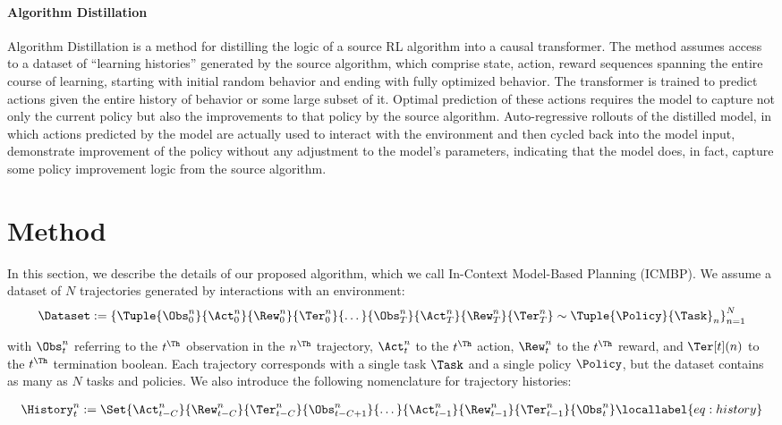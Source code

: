 \paragraph{Algorithm Distillation}
Algorithm Distillation \parencite{laskin2022context} is a method for distilling the
logic of a source RL algorithm into a causal transformer. The method assumes
access to a dataset of ``learning histories'' generated by the source algorithm,
which comprise state, action, reward sequences spanning the entire course of
learning, starting with initial random behavior and ending with fully optimized
behavior. The transformer is trained to predict actions given the entire history
of behavior or some large subset of it. Optimal prediction of these actions
requires the model to capture not only the current policy but also the
improvements to that policy by the source algorithm. Auto-regressive rollouts of
the distilled model, in which actions predicted by the model are actually used
to interact with the environment and then cycled back into the model input,
demonstrate improvement of the policy without any adjustment to the model's
parameters, indicating that the model does, in fact, capture some policy
improvement logic from the source algorithm.

\section{Method}
In this section, we describe the details of our proposed algorithm, which we
call In-Context Model-Based Planning (ICMBP). We assume a dataset of $N$
trajectories generated by interactions with an environment:
\begin{align}
    \Dataset :=
    \left\{
    \Tuple
    { \Obs^n_0 }
    { \Act^n_0 }
    { \Rew^n_0 }
    { \Ter^n_0 }
    { \dots }
    { \Obs^n_T }
    { \Act^n_T }
    { \Rew^n_T }
    { \Ter^n_T }
    \sim \Tuple {\Policy}{\Task}_n
    \right\}_{n=1}^N
\end{align}

with $\Obs^n_t$ referring to the $t^\Th$ observation in the $n^\Th$
trajectory, $\Act^n_t$ to the $t^\Th$ action, $\Rew^n_t$ to the $t^\Th$
reward, and $\Ter[t](n)$ to the $t^\Th$ termination boolean. Each trajectory
corresponds with a single task $\Task$ and a single policy $\Policy$, but the
dataset contains as many as $N$ tasks and policies. We also introduce the
following nomenclature for trajectory histories:

\begin{align}
    \History^n_t :=
    \Set
    { \Act^n_{t-C} }
    { \Rew^n_{t-C} }
    { \Ter^n_{t-C} }
    { \Obs^n_{t-C+1} }
    { \dots }
    { \Act^n_{t-1} }
    { \Rew^n_{t-1} }
    { \Ter^n_{t-1} }
    { \Obs^n_{t} }
    \locallabel{eq:history}
\end{align}

